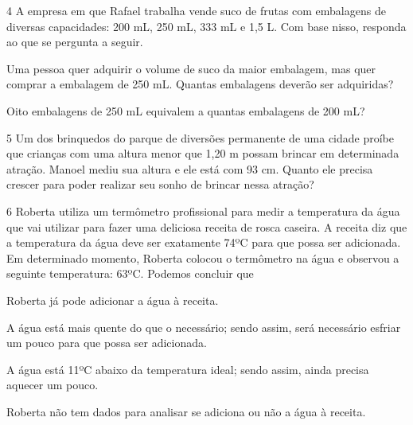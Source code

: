 \begin{mdframed}[linewidth=2pt,linecolor=salmao,roundcorner=2pt]

\num{4} A empresa em que Rafael trabalha vende suco de frutas com embalagens de
diversas capacidades: 200 mL, 250 mL, 333 mL e 1,5 L. Com base nisso, responda ao que se pergunta a seguir.

\begin{escolha}
\item Uma pessoa quer adquirir o volume de suco da maior embalagem,
  mas quer comprar a embalagem de 250 mL. Quantas embalagens deverão ser adquiridas?


\item Oito embalagens de 250 mL equivalem a quantas embalagens de 200 mL?

\end{escolha}


\num{5} Um dos brinquedos do parque de diversões permanente de uma cidade proíbe
que crianças com uma altura menor que 1,20 m possam brincar em determinada
atração. Manoel mediu sua altura e ele está com 93 cm. Quanto ele
precisa crescer para poder realizar seu sonho de brincar nessa atração?

\begin{mdframed}[linewidth=2pt,linecolor=salmao,roundcorner=2pt]


\end{mdframed}

\num{6} Roberta utiliza um termômetro profissional para medir a temperatura da
água que vai utilizar para fazer uma deliciosa receita de rosca
caseira. A receita diz que a temperatura da água deve ser exatamente 74ºC
para que possa ser adicionada. Em determinado momento, Roberta colocou
o termômetro na água e observou a seguinte temperatura: 63ºC. Podemos concluir que

\begin{escolha}
\item
  Roberta já pode adicionar a água à receita.
\item
  A água está mais quente do que o necessário; sendo assim, será
  necessário esfriar um pouco para que possa ser adicionada.
\item
  A água está 11ºC abaixo da temperatura ideal; sendo assim, ainda
  precisa aquecer um pouco.
\item
  Roberta não tem dados para analisar se adiciona ou não a água à receita.
\end{escolha}


\end{mdframed}
